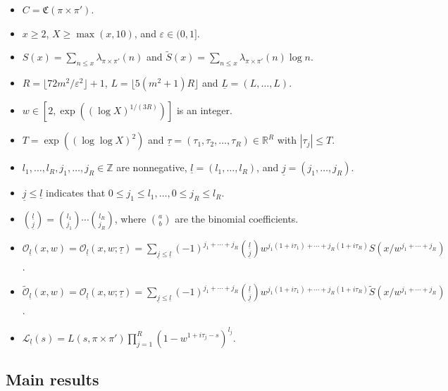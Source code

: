 \documentclass[12pt,reqno]{amsart}
\theoremstyle{remark}
\numberwithin{equation}{section}
\begin{document}
    \begin{itemize}
        \item  $C = \mathfrak{C}(\pi\times \pi')$.
        \item $x\geq 2$, $X\geq\max(x,10)$, and $\varepsilon \in (0,1]$.
        \item $S(x) = \sum_{n\le x} \lambda_{\pi \times \pi'}(n)$ and $\widetilde{S}(x) = \sum_{n \le x} \lambda_{\pi \times \pi'}(n) \log n$.
        \item $R = \lfloor 72m^2/\varepsilon^2\rfloor + 1$, $L = \lfloor 5(m^2+1)R \rfloor$ and $\underline{L} = (L, \ldots, L)$.
        \item $w\in [2,\exp((\log X)^{1/(3R)})]$ is an integer.
        \item $T = \exp((\log\log X)^2)$ and $\underline{\tau}=(\tau_1, \tau_2, \ldots, \tau_R)\in\mathbb{R}^R$ with $|\tau_j| \le T$.
        \item  $l_1, \ldots, l_R, j_1, \ldots, j_R \in\mathbb{Z}$ are nonnegative, $\underline{l} =(l_1,\ldots, l_R)$, and $\underline{j} = (j_1, \ldots, j_R)$.
        \item  $\underline{j} \le \underline{l}$ indicates that $0 \le j_1 \le l_1, \ldots, 0\le j_R \le l_R$.
        \item $\binom{\underline{l}}{\underline{j}} = \binom{l_1}{j_1} \cdots \binom{l_R}{j_R}$, where $\binom{a}{b}$ are the binomial coefficients.
        \item $\mathcal{O}_{\underline{l}}(x,w)= \mathcal{O}_{\underline{l}}(x,w; \underline{\tau}) = \sum_{\underline{j}\le \underline{l}} (-1)^{j_1+\cdots+j_R} \binom{\underline{l}}{\underline{j}} w^{j_1(1+i\tau_1) + \cdots + j_R(1+i\tau_R)} S(x/w^{j_1+\cdots+j_R})$.
        \item $\widetilde{\mathcal{O}}_{\underline{l}}(x,w)= \mathcal{O}_{\underline{l}}(x,w; \underline{\tau}) = \sum_{\underline{j}\le \underline{l}} (-1)^{j_1+\cdots+j_R} \binom{\underline{l}}{\underline{j}} w^{j_1(1+i\tau_1) + \cdots + j_R(1+i\tau_R)} \widetilde{S}(x/w^{j_1+\cdots+j_R})$.
        \item $\mathcal{L}_{\underline{l}}(s) = L(s, \pi\times\pi') \prod_{j=1}^{R}(1-w^{1+i\tau_j -s} )^{l_j}$. 
    \end{itemize}
    


    
    \subsection{Main results}
    \label{subsec:main-weak-sub}
\end{document}

